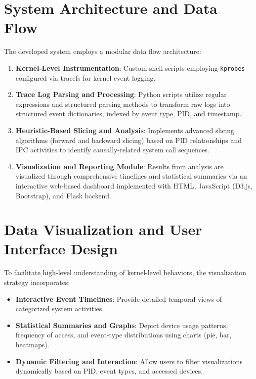 \documentclass[a4paper,12pt]{report}
\begin{document}
\section{System Architecture and Data Flow}
The developed system employs a modular data flow architecture:
\begin{enumerate}
\item \textbf{Kernel-Level Instrumentation}: Custom shell scripts employing \texttt{kprobes} configured via tracefs for kernel event logging.
\item \textbf{Trace Log Parsing and Processing}: Python scripts utilize regular expressions and structured parsing methods to transform raw logs into structured event dictionaries, indexed by event type, PID, and timestamp.
\item \textbf{Heuristic-Based Slicing and Analysis}: Implements advanced slicing algorithms (forward and backward slicing) based on PID relationships and IPC activities to identify causally-related system call sequences.
\item \textbf{Visualization and Reporting Module}: Results from analysis are visualized through comprehensive timelines and statistical summaries via an interactive web-based dashboard implemented with HTML, JavaScript (D3.js, Bootstrap), and Flask backend.
\end{enumerate}

\section{Data Visualization and User Interface Design}
To facilitate high-level understanding of kernel-level behaviors, the visualization strategy incorporates:
\begin{itemize}
\item \textbf{Interactive Event Timelines}: Provide detailed temporal views of categorized system activities.
\item \textbf{Statistical Summaries and Graphs}: Depict device usage patterns, frequency of access, and event-type distributions using charts (pie, bar, heatmaps).
\item \textbf{Dynamic Filtering and Interaction}: Allow users to filter visualizations dynamically based on PID, event types, and accessed devices.
\end{itemize}



\end{document}
